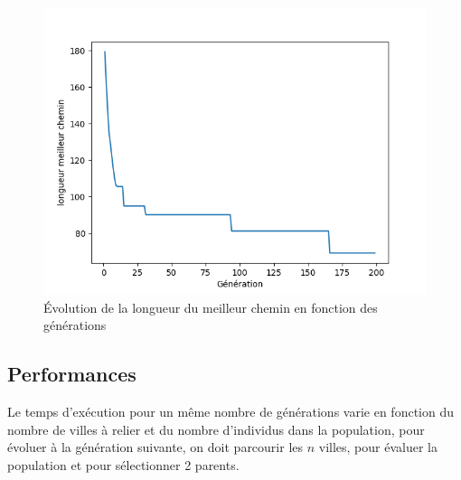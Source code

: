 \documentclass[11pt]{article}
\begin{document}
\begin{figure}[H]
\centering
\includegraphics[width=.9\linewidth]{./evol.png}
\caption{Évolution de la longueur du meilleur chemin en fonction des générations}
\end{figure}

\subsection{Performances}

Le temps d'exécution pour un même nombre de générations varie en fonction du nombre de villes à relier et du nombre
d'individus dans la population, pour évoluer à la génération suivante, on doit parcourir les $n$ villes, pour évaluer
la population et pour sélectionner 2 parents. 
\end{document}
